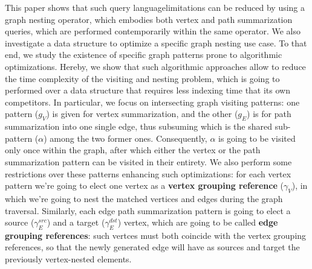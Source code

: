 This paper shows that such query languagelimitations can be reduced by using a graph nesting operator, which embodies both vertex and path summarization queries, which are performed contemporarily within the same operator. %
We also investigate a data structure to optimize a specific graph nesting use case. To that end, we study the existence of specific graph patterns prone to algorithmic optimizations. Hereby, we show that such algorithmic approaches allow to reduce the time complexity of the visiting and nesting problem, which is going to performed over a data structure that requires less indexing time that its own competitors. In particular, we focus on intersecting graph visiting patterns: one pattern ($g_V$) is given for vertex summarization, and the other ($g_E$) is for path summarization into one single edge, thus subsuming which is the shared sub-pattern ($\alpha$) among the two former ones. Consequently, $\alpha$ is going to be visited only once within the graph, after which either the vertex or the path summarization pattern can be visited in their entirety. We also perform some restrictions over these patterns enhancing such optimizations: for each vertex pattern we're going to elect one vertex as a \textbf{vertex grouping reference} ($\gamma_V$), in which we're going to nest the matched vertices and edges  during the graph traversal. Similarly, each edge path summarization pattern is going to elect a source ($\gamma_E^{src}$) and a target ($\gamma_E^{dst}$) vertex, which are going to be called \textbf{edge grouping references}: such vertces must both coincide with the vertex grouping references, so that the newly generated edge will have as sources and target the previously vertex-nested elements. 

